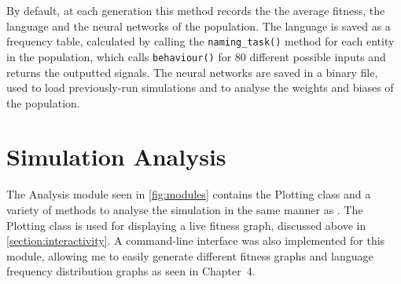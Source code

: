 \documentclass[12pt,a4paper]{report}
\begin{document}

By default, at each generation this method records the the average fitness, the language and the neural networks of the population. The language is saved as a frequency table, calculated by calling the \texttt{naming\_task()} method for each entity in the population, which calls \texttt{behaviour()} for 80 different possible inputs and returns the outputted signals. The neural networks are saved in a binary file, used to load previously-run simulations and to analyse the weights and biases of the population.

\section{Simulation Analysis}\label{section:impl-analysis}

The Analysis module seen in \cref{fig:modules} contains the Plotting class and a variety of methods to analyse the simulation in the same manner as \citet{Cangelosi1998}. The Plotting class is used for displaying a live fitness graph, discussed above in \cref{section:interactivity}. A command-line interface was also implemented for this module, allowing me to easily generate different fitness graphs and language frequency distribution graphs as seen in Chapter~4.
\end{document}
